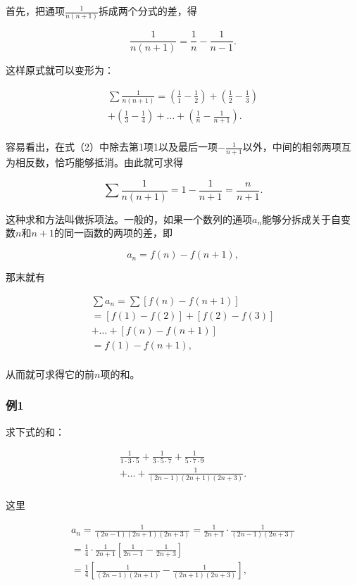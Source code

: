 首先，把通项\(\frac{1}{n(n + 1)}\)拆成两个分式的差，得

\[
\frac{1}{n (n + 1)} = \frac{1}{n} - \frac{1}{n - 1}. \tag {1}
\]

这样原式就可以变形为：

\[
\begin{array}{l} \sum \frac{1}{n (n + 1)} = \left(\frac{1}{1} - \frac{1}{2}\right) + \left(\frac{1}{2} - \frac{1}{3}\right) \\ + \left(\frac{1}{3} - \frac{1}{4}\right) + \dots + \left(\frac{1}{n} - \frac{1}{n + 1}\right). \tag {2} \\ \end{array}
\]

容易看出，在式（2）中除去第1项1以及最后一项\(-\frac{1}{n+1}\)以外，中间的相邻两项互为相反数，恰巧能够抵消。由此就可求得

\[
\sum \frac{1}{n (n + 1)} = 1 - \frac{1}{n + 1} = \frac{n}{n + 1}.
\]

这种求和方法叫做拆项法。一般的，如果一个数列的通项\(a_{n}\)能够分拆成关于自变数\(n\)和\(n + 1\)的同一函数的两项的差，即

\[
a_{n} = f (n) - f (n + 1),
\]

那末就有

\[
\begin{array}{l} \sum a_{n} = \sum [ f (n) - f (n + 1) ] \\ = [ f (1) - f (2) ] + [ f (2) - f (3) ] \\ + \dots + [ f (n) - f (n + 1) ] \\ = f (1) - f (n + 1), \\ \end{array}
\]

从而就可求得它的前\(n\)项的和。

\subsubsection{例1}

求下式的和：

\[
\begin{array}{l} \frac{1}{1 \cdot 3 \cdot 5} + \frac{1}{3 \cdot 5 \cdot 7} + \frac{1}{5 \cdot 7 \cdot 9} \\ + \dots + \frac{1}{(2 n - 1) (2 n + 1) (2 n + 3)}. \\ \end{array}
\]

 这里

\[
\begin{array}{l} a_{n} = \frac{1}{(2 n - 1) (2 n + 1) (2 n + 3)} = \frac{1}{2 n + 1} \cdot \frac{1}{(2 n - 1) (2 n + 3)} \\ = \frac{1}{4} \cdot \frac{1}{2 n + 1} \left[ \frac{1}{2 n - 1} - \frac{1}{2 n + 3} \right] \\ = \frac{1}{4} \left[ \frac{1}{(2 n - 1) (2 n + 1)} - \frac{1}{(2 n + 1) (2 n + 3)} \right], \\ \end{array}
\]

